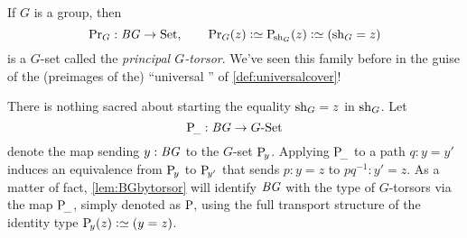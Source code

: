 \begin{example}\label{def:principaltorsor}
  If $G$ is a group, then
$$\princ G:\BG\to\Set,\qquad\princ G(z)\defequi\pathsp{\shape_G}(z)\defequi(\shape_G=z)$$ is a $G$-set called the \emph{principal $G$-torsor}.
We've seen this family before in the guise of the (preimages of the) ``universal \covering'' of \cref{def:universalcover}!

There is nothing sacred about starting the equality $\mathrm{sh}_G = z$ in $\mathrm{sh}_G$.
Let
$$\mathrm{P}_{\!\_}:\mathit{B}\mathit{G}\to\mathord{G\textrm{-}\mathrm{Set}}$$ denote the map sending $y:\mathit{B}\mathit{G}$ to the $G$-set $\mathrm{P}_{\!y}$.
Applying $\mathrm{P}_{\!\_}$ to a path $q:y=y'$
induces an equivalence from $\mathrm{P}_{\!y}$ to $\mathrm{P}_{\!y'}$ that sends $p:y=z$ to $pq^{-1}:y'=z$. As a matter of fact, \cref{lem:BGbytorsor} will identify $\mathit{B}\mathit{G}$ with the type of $G$-torsors via the map $\mathrm{P}_{\!\_}$, simply denoted as $\mathrm{P}_{\!}$,
using the full transport structure of the identity type $\pathsp y(z)\defequi(y=z)$.
\end{example}

